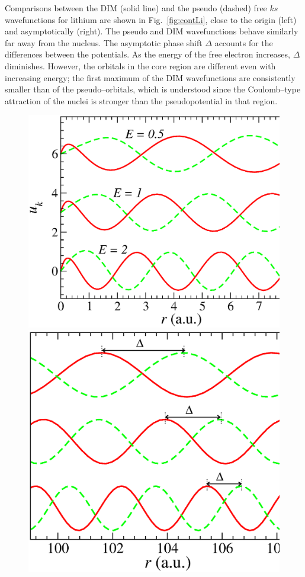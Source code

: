 \documentclass[10pt]{article}
\begin{document}
Comparisons between the DIM (solid line) and the pseudo (dashed)
free $ks$ wavefunctions for lithium are shown in Fig.~\ref{fig:contLi},
close to the origin (left) and asymptotically (right).
The pseudo and DIM wavefunctions behave similarly far away from the nucleus.
The asymptotic phase shift $\Delta$ accounts for the differences 
between the potentials. As the 
energy of the free electron increases, $\Delta$ diminishes. 
However, the orbitals in the core region are different even with 
increasing energy; the first maximum of the DIM wavefunctions 
are consistently smaller than of the pseudo--orbitals, which is 
understood since the Coulomb--type attraction of the nuclei is 
stronger than the pseudopotential in that region. 
\begin{figure}[H]
\centering
\includegraphics[height=0.23\textheight]{figures/pseudopot/LicontA.eps}
\includegraphics[height=0.23\textheight]{figures/pseudopot/LicontB.eps}

\end{figure}
\end{document}
